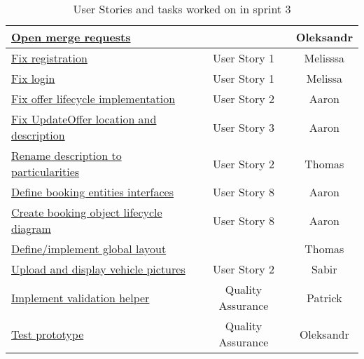 \begin{table}[h]
    \centering
    \caption{\label{tab:user-stories-sprint-3}User Stories and tasks worked on in sprint 3}
    \begin{tabular}{|l|c|c|}
        \hline
        \href{https://gitlab.rz.uni-bamberg.de/swt/teaching/2021-ws/swt-swl-b/group-a/-/issues/80}{Open merge requests} &  & Oleksandr \\
        \hline
        \href{https://gitlab.rz.uni-bamberg.de/swt/teaching/2021-ws/swt-swl-b/group-a/-/issues/66}{Fix registration} & User Story 1 & Melisssa \\
        \hline
        \href{https://gitlab.rz.uni-bamberg.de/swt/teaching/2021-ws/swt-swl-b/group-a/-/issues/65}{Fix login} & User Story 1 & Melissa \\
        \hline
        \href{https://gitlab.rz.uni-bamberg.de/swt/teaching/2021-ws/swt-swl-b/group-a/-/issues/77}{Fix offer lifecycle implementation} & User Story 2 & Aaron \\
        \hline
        \href{https://gitlab.rz.uni-bamberg.de/swt/teaching/2021-ws/swt-swl-b/group-a/-/issues/64}{Fix UpdateOffer location and description} & User Story 3 & Aaron \\
        \hline
        \href{https://gitlab.rz.uni-bamberg.de/swt/teaching/2021-ws/swt-swl-b/group-a/-/issues/76}{Rename description to particularities} & User Story 2 & Thomas \\
        \hline
        \href{https://gitlab.rz.uni-bamberg.de/swt/teaching/2021-ws/swt-swl-b/group-a/-/issues/68}{Define booking entities interfaces} & User Story 8 & Aaron \\
        \hline
        \href{https://gitlab.rz.uni-bamberg.de/swt/teaching/2021-ws/swt-swl-b/group-a/-/issues/82}{Create booking object lifecycle diagram} & User Story 8 & Aaron \\
        \hline
        \href{https://gitlab.rz.uni-bamberg.de/swt/teaching/2021-ws/swt-swl-b/group-a/-/issues/63}{Define/implement global layout} &  & Thomas \\
        \hline
        \href{https://gitlab.rz.uni-bamberg.de/swt/teaching/2021-ws/swt-swl-b/group-a/-/issues/67}{Upload and display vehicle pictures} & User Story 2 & Sabir \\
        \hline
        \href{https://gitlab.rz.uni-bamberg.de/swt/teaching/2021-ws/swt-swl-b/group-a/-/issues/62}{Implement validation helper} & Quality Assurance  & Patrick \\
        \hline
        \href{https://gitlab.rz.uni-bamberg.de/swt/teaching/2021-ws/swt-swl-b/group-a/-/issues/81}{Test prototype} & Quality Assurance  & Oleksandr \\

\end{tabular}
\end{table}
